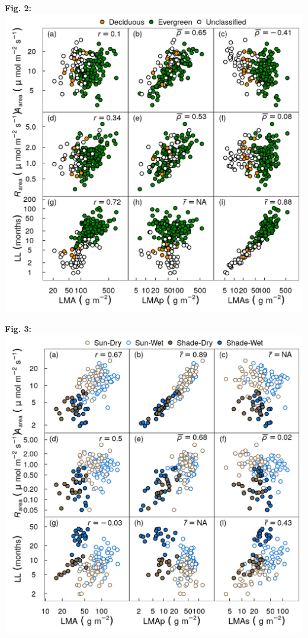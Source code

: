 \documentclass[
  12pt,
  letterpaper,
  DIV=11,
  numbers=noendperiod]{scrartcl}
\begin{document}
\textbf{Fig. 2:} \includegraphics{../figs/gl_point.png} \newpage

\textbf{Fig. 3:} \includegraphics{../figs/pa_point.png} \newpage
\end{document}
